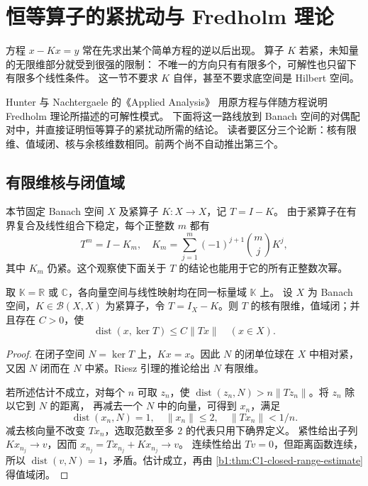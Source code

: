 \section{恒等算子的紧扰动与 Fredholm 理论}
\label{b1:sec:C104}

方程 \(x-Kx=y\) 常在先求出某个简单方程的逆以后出现。
算子 \(K\) 若紧，未知量的无限维部分就受到很强的限制：
不唯一的方向只有有限多个，可解性也只留下有限多个线性条件。
这一节不要求 \(K\) 自伴，甚至不要求底空间是 Hilbert 空间。

\ProseParagraphBreak

Hunter 与 Nachtergaele 的《Applied Analysis》\cite[Section 8.3]{Hunter2001Applied}
用原方程与伴随方程说明 Fredholm 理论所描述的可解性模式。
下面将这一路线放到 Banach 空间的对偶配对中，并直接证明恒等算子的紧扰动所需的结论。
读者要区分三个论断：核有限维、值域闭、核与余核维数相同。前两个尚不自动推出第三个。

\subsection{有限维核与闭值域}
\label{b1:subsec:C10401}

本节固定 Banach 空间 \(X\) 及紧算子 \(K:X\rightarrow X\)，记 \(T=I-K\)。
由于紧算子在有界复合及线性组合下稳定，每个正整数 \(m\) 都有
\[
 T^m=I-K_m,\quad
 K_m=\sum_{j=1}^m(-1)^{j+1}\binom mjK^j,
\]
其中 \(K_m\) 仍紧。这个观察使下面关于 \(T\) 的结论也能用于它的所有正整数次幂。

\begin{lemma}\label{b1:lem:C1-compact-perturbation-range}
取 \(\mathbb K=\mathbb R\) 或 \(\mathbb C\)，各向量空间与线性映射均在同一标量域 \(\mathbb K\) 上。
设 \(X\) 为 Banach 空间，\(K\in\mathcal B(X,X)\) 为紧算子，令 \(T=I_X-K\)。则 \(T\) 的核有限维，值域闭；并且存在 \(C>0\)，使
\[
 \operatorname{dist}(x,\ker T)\leq C\|Tx\|\quad(x\in X).
\]
\end{lemma}
\begin{proof}
在闭子空间 \(N=\ker T\) 上，\(Kx=x\)。因此 \(N\) 的闭单位球在 \(X\) 中相对紧，
又因 \(N\) 闭而在 \(N\) 中紧。Riesz 引理的推论给出 \(N\) 有限维。

若所述估计不成立，对每个 \(n\) 可取 \(z_n\)，使
\(\operatorname{dist}(z_n,N)>n\|Tz_n\|\)。将 \(z_n\) 除以它到 \(N\) 的距离，
再减去一个 \(N\) 中的向量，可得到 \(x_n\)，满足
\[
 \operatorname{dist}(x_n,N)=1,\quad \|x_n\|\leq2,\quad \|Tx_n\|<1/n.
\]
减去核向量不改变 \(Tx_n\)，选取范数至多 \(2\) 的代表只用下确界定义。
紧性给出子列 \(Kx_{n_j}\rightarrow v\)，因而
\(x_{n_j}=Tx_{n_j}+Kx_{n_j}\rightarrow v\)。
连续性给出 \(Tv=0\)，但距离函数连续，所以
\(\operatorname{dist}(v,N)=1\)，矛盾。估计成立，再由%
\cref{b1:thm:C1-closed-range-estimate}得值域闭。
\end{proof}

